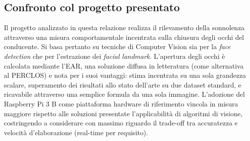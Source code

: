 \documentclass[12pt]{article}
\begin{document}
\subsection{Confronto col progetto presentato}
Il progetto analizzato in questa relazione realizza il rilevamento della sonnolenza attraverso una misura comportamentale incentrata sulla chiusura degli occhi del conducente. Si basa pertanto su tecniche di Computer Vision sia per la \textit{face detection} che per l'estrazione dei \textit{facial landmark}. L'apertura degli occhi è calcolata mediante l'EAR, una soluzione diffusa in letteratura (come alternativa al PERCLOS) e nota per i suoi vantaggi: stima incentrata su una sola grandezza scalare, superamento dei risultati allo stato dell'arte su due dataset standard, e ricavabile attraverso una semplice formula da una sola immagine. L'adozione del Raspberry Pi 3 B come piattaforma hardware di riferimento vincola in misura maggiore rispetto alle soluzioni presentate l'applicabilità di algoritmi di visione, costringendo a considerare con massimo riguardo il trade-off tra accuratezza e velocità d'elaborazione (real-time per requisito).

\end{document}
